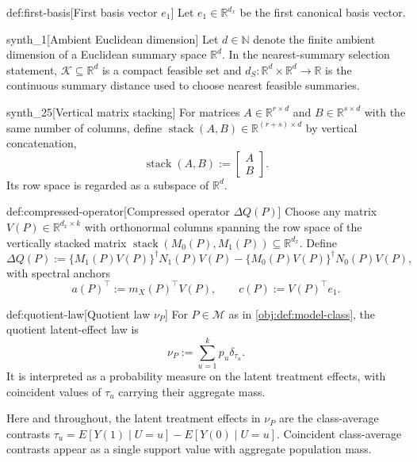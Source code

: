 \begin{definitionv}{def:first-basis}[First basis vector \(e_1\)]
Let \(e_1\in\mathbb R^{d_x}\) be the first canonical basis vector.
\end{definitionv}

\begin{definitionv}{synth_1}[Ambient Euclidean dimension]
Let \(d\in\mathbb N\) denote the finite ambient dimension of a Euclidean summary space \(\mathbb R^d\). In the nearest-summary selection statement, \(\mathcal K\subseteq\mathbb R^d\) is a compact feasible set and \(d_S:\mathbb R^d\times\mathbb R^d\to\mathbb R\) is the continuous summary distance used to choose nearest feasible summaries.
\end{definitionv}

\begin{definitionv}{synth_25}[Vertical matrix stacking]
For matrices \(A\in\mathbb R^{r\times d}\) and \(B\in\mathbb R^{s\times d}\) with the same number of columns, define \(\operatorname{stack}(A,B)\in\mathbb R^{(r+s)\times d}\) by vertical concatenation,\[\operatorname{stack}(A,B):=\begin{bmatrix}A\\ B\end{bmatrix}.\] Its row space is regarded as a subspace of \(\mathbb R^d\).
\end{definitionv}

\begin{definitionv}{def:compressed-operator}[Compressed operator \(\Delta Q(P)\)]
Choose any matrix \(V(P)\in\mathbb R^{d_x\times k}\) with orthonormal columns spanning the row space of the vertically stacked matrix \(\operatorname{stack}(M_0(P),M_1(P))\subseteq\mathbb R^{d_x}\). Define
\[
\Delta Q(P)
:=
\{M_1(P)V(P)\}^{\dagger}N_1(P)V(P)
-
\{M_0(P)V(P)\}^{\dagger}N_0(P)V(P),
\]
with spectral anchors
\[
a(P)^\top:=m_X(P)^\top V(P),
\qquad
c(P):=V(P)^\top e_1.
\]
\end{definitionv}

\begin{definitionv}{def:quotient-law}[Quotient law \(\nu_P\)]
For \(P\in\mathcal M\) as in \cref{obj:def:model-class}, the quotient latent-effect law is
\[
\nu_P:=\sum_{u=1}^{k}p_u\delta_{\tau_u}.
\]
It is interpreted as a probability measure on the latent treatment effects, with coincident values of \(\tau_u\) carrying their aggregate mass.
\end{definitionv}

Here and throughout, the latent treatment effects in \(\nu_P\) are the class-average contrasts \(\tau_u=E[Y(1)\mid U=u]-E[Y(0)\mid U=u]\). Coincident class-average contrasts appear as a single support value with aggregate population mass.

